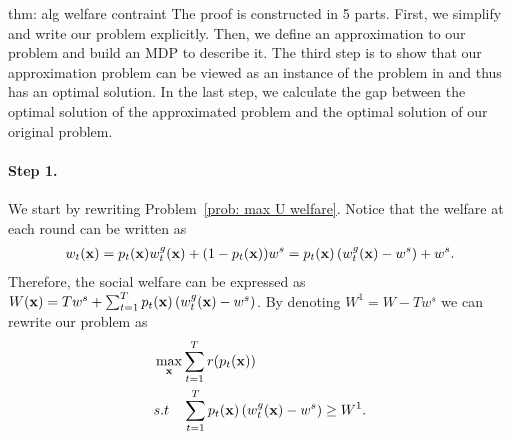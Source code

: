 \begin{proofof}{thm: alg welfare contraint}
The proof is constructed in 5 parts. First, we simplify and write our problem explicitly. Then, we define an approximation to our problem and build an MDP to describe it. The third step is to show that our approximation problem can be viewed as an instance of the problem in \cite{ben2024principal} and thus has an optimal solution. In the last step, we calculate the gap between the optimal solution of the approximated problem and the optimal solution of our original problem.

\paragraph{Step 1.}
We start by rewriting Problem~\ref{prob: max U welfare}. Notice that the welfare at each round can be written as
\begin{align*}
w_t({\bf{x}}) = p_t({\bf{x}}) w^g_t({\bf{x}}) + (1-p_t({\bf{x}})) w^s = p_t({\bf{x}}) \left(w^g_t({\bf{x}}) - w^s \right) + w^s.
\end{align*}
Therefore, the social welfare can be expressed as $W({\bf{x}}) = T w^s + \sum_{t = 1}^T p_t({\bf{x}}) \left(w^g_t({\bf{x}}) - w^s \right)$. By denoting $W^1 = W - Tw^s$ we can rewrite our problem as 
\begin{align*}
    & \max_{{\bf{x}}} \sum_{t = 1}^T r(p_t({\bf{x}}))  \\
    & s.t \quad \sum_{t = 1}^T p_t({\bf{x}}) \left(w^g_t({\bf{x}}) - w^s \right) \geq W^1.
\end{align*}


\end{proofof}
